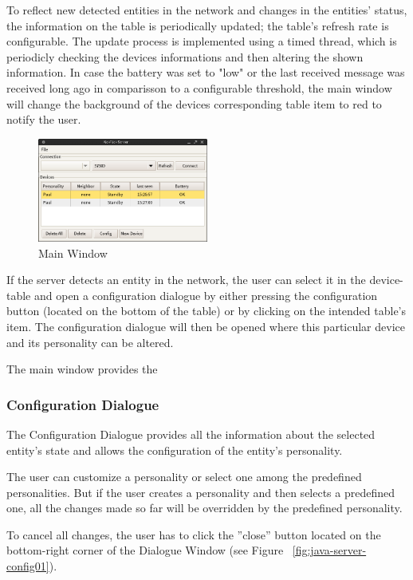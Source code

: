 To reflect new detected entities in the network and changes in the entities' status, the information on the table is periodically updated; the table's refresh rate is configurable. 
The update process is implemented using a timed thread, which is periodicly checking the devices informations and then altering the shown information. In case the battery was set to "low" or the last received message was received long ago in comparisson to a configurable threshold, the main window will change the background of the devices corresponding table item to red to notify the user. 
\begin{figure}[h!]
 \centering
 \includegraphics[width= 0.5\textwidth, clip=true  ,keepaspectratio=true]{./pic/java-server-main.png}
 \caption{Main Window}
 \label{java-server-main}
\end{figure}

If the server detects an entity in the network, the user can select it in the device-table and open a configuration dialogue by either pressing the configuration button (located on the bottom of the table) or by clicking on the intended table's item. The configuration dialogue will then be opened where this particular device and its personality can be altered.

The main window provides the 

\subsubsection{Configuration Dialogue}

The Configuration Dialogue provides all the information about the selected entity's state and allows the configuration of the entity's personality. 

The user can customize a personality or select one among the predefined personalities. But if the user creates a personality and then selects a predefined one, all the changes made so far will be overridden by the predefined personality. 

To cancel all changes, the user has to click the ''close'' button located on the bottom-right corner of the Dialogue Window (see Figure ~\ref{fig:java-server-config01}).   

